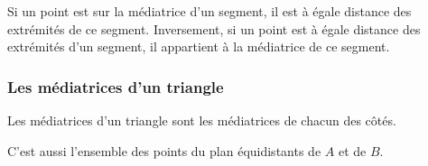 \documentclass[a4paper,10pt]{report}
\begin{document}
\begin{prop}
Si un point est sur la médiatrice d'un segment, il est à égale distance des extrémités de ce segment.
Inversement, si un point est à égale distance des extrémités d'un segment, il appartient à la médiatrice de ce segment.
\end{prop}


\subsubsection{Les médiatrices d'un triangle}

\begin{defn}
Les médiatrices d'un triangle sont les médiatrices de chacun des côtés.
\end{defn}

\begin{rem}

\begin{minipage}{10cm}
C'est aussi l'ensemble des points du plan équidistants de $A$ et de $B$. \\\medskip


\end{minipage}
\end{rem}
\end{document}
